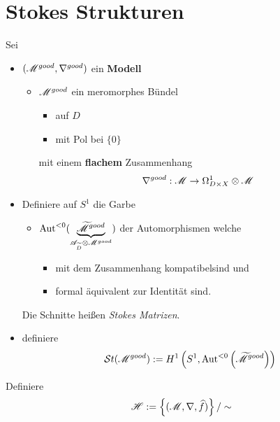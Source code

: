 \section{Stokes Strukturen} %
Sei
\begin{itemize}
  \item $(\mathscr{M}^{good},\nabla^{good})$ ein \textbf{Modell}
    \begin{itemize}
      \item $\mathscr{M}^{good}$ ein meromorphes Bündel
        \begin{itemize}
          \item auf $D$
          \item mit Pol bei $\{0\}$
        \end{itemize}
        mit einem \textbf{flachem} Zusammenhang
        \[
          \nabla^{good}:\mathscr{M}\to\Omega_{D\times X}^1\otimes \mathscr{M}
        \]
    \end{itemize}
\end{itemize}
\begin{defn}
  \begin{itemize}
    \item Definiere auf $S^1$ die Garbe
      \begin{itemize}
        \item $\operatorname{Aut}^{<0}(
          \underset{\mathscr{A}_{\widetilde D}\otimes\mathscr{M}^{good}}
          {\underbrace{\widetilde{\mathscr{M}}^{good}}})$ der Automorphismen
          welche
          \begin{itemize}
            \item mit dem Zusammenhang kompatibel\TODO[in Formeln] sind und
            \item formal äquivalent zur Identität sind.
          \end{itemize}
      \end{itemize}
      Die Schnitte heißen \emph{Stokes Matrizen}.
    \item definiere
      \[
        \mathcal{S}{}t(\mathscr{M}^{good})
          :=H^1\left(S^1,\operatorname{Aut}^{<0}\left(\widetilde {\mathscr{M}}^{good}\right)\right)
      \]
  \end{itemize}
\end{defn}

\begin{comment}
  Definiere $\sH_X$ als die (Prä-)Garbe auf $X$ mit
  \[
    U\mapsto\sH_X(U)=\{(\sM,\nabla,\hat f) \mid \text{definiert auf $U$}\}
    /\sim
  \]
\end{comment}
Definiere 
\[
  \mathscr{H}:=\left\{(\mathscr{M},\nabla,\widehat f)\right\}/\sim
\]

